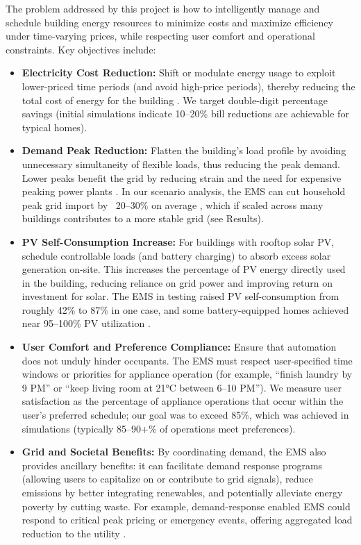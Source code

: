 \documentclass[12pt,a4paper]{article}
\begin{document}
The problem addressed by this project is how to intelligently manage and schedule building energy resources to minimize costs and maximize efficiency under time-varying prices, while respecting user comfort and operational constraints. Key objectives include:
\begin{itemize}
    \item \textbf{Electricity Cost Reduction:} Shift or modulate energy usage to exploit lower-priced time periods (and avoid high-price periods), thereby reducing the total cost of energy for the building \cite{Mahmoudi2020, AlSorour2022}. We target double-digit percentage savings (initial simulations indicate 10–20\% bill reductions are achievable for typical homes).
    \item \textbf{Demand Peak Reduction:} Flatten the building’s load profile by avoiding unnecessary simultaneity of flexible loads, thus reducing the peak demand. Lower peaks benefit the grid by reducing strain and the need for expensive peaking power plants \cite{Koltsaklis2019, Chen2024}. In our scenario analysis, the EMS can cut household peak grid import by ~20–30\% on average \cite{Koltsaklis2019}, which if scaled across many buildings contributes to a more stable grid (see Results).
    \item \textbf{PV Self-Consumption Increase:} For buildings with rooftop solar PV, schedule controllable loads (and battery charging) to absorb excess solar generation on-site. This increases the percentage of PV energy directly used in the building, reducing reliance on grid power and improving return on investment for solar. The EMS in testing raised PV self-consumption from roughly 42\% to 87\% in one case, and some battery-equipped homes achieved near 95–100\% PV utilization \cite{Yoshida2018, TostadoVeliz2023}.
    \item \textbf{User Comfort and Preference Compliance:} Ensure that automation does not unduly hinder occupants. The EMS must respect user-specified time windows or priorities for appliance operation (for example, “finish laundry by 9 PM” or “keep living room at 21°C between 6–10 PM”). We measure user satisfaction as the percentage of appliance operations that occur within the user's preferred schedule; our goal was to exceed 85\%, which was achieved in simulations (typically 85–90+\% of operations meet preferences).
    \item \textbf{Grid and Societal Benefits:} By coordinating demand, the EMS also provides ancillary benefits: it can facilitate demand response programs (allowing users to capitalize on or contribute to grid signals), reduce emissions by better integrating renewables, and potentially alleviate energy poverty by cutting waste. For example, demand-response enabled EMS could respond to critical peak pricing or emergency events, offering aggregated load reduction to the utility \cite{Chen2024}.
\end{itemize}
\end{document}
